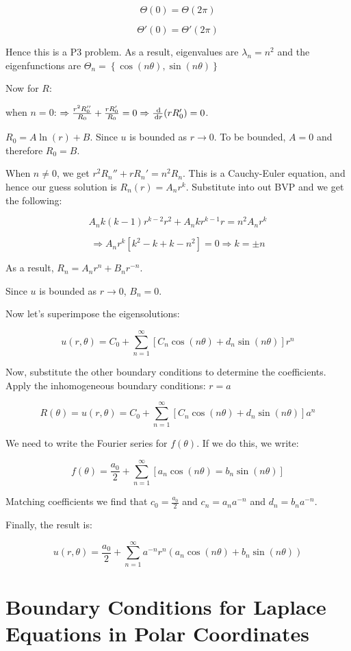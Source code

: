 \documentclass{article}
\begin{document}
$$\Theta(0) = \Theta(2 \pi)$$

$$\Theta'(0) = \Theta' (2 \pi)$$

Hence this is a P3 problem. As a result, eigenvalues are $\lambda_n = n^2$ and the eigenfunctions are $\Theta_n = \left\{ \cos (n \theta), \sin (n \theta) \right\} $


\hfill

Now for $R$:

when $n = 0$: $\Rightarrow \frac{r^2 R_0 ''}{R_0} + \frac{r R_0 '}{R_0} = 0 \Rightarrow \frac{\,\mathrm{d}}{\,\mathrm{d} r} (r R_0') = 0$. 

$R_0 = A \ln(r) + B$. Since $u$ is bounded as $r \to 0$. To be bounded, $A = 0$ and therefore $R_0 = B$. 

When $n \neq 0$, we get $r^2 R_n'' + r R_n' = n^2 R_n$. This is a Cauchy-Euler equation, and hence our guess solution is $R_n(r) = A_n r^k$. Substitute into out BVP and we get the following:

$$A_n k (k-1) r^{k-2} r^2 + A_n k r^{k-1} r = n^2 A_n r^k$$

$$\Rightarrow A_n r^k \left[ k^2 - k + k - n^2 \right] = 0 \Rightarrow k = \pm n$$

As a result, $R_n = A_n r^n + B_n r^{-n}$. 

Since $u$ is bounded as $r \to 0$, $B_n = 0$. 

Now let's superimpose the eigensolutions:

$$u(r, \theta) = C_0 + \sum_{n=1}^\infty \left[ C_n \cos (n \theta) + d_n \sin (n \theta) \right] r^n$$

Now, substitute the other boundary conditions to determine the coefficients. Apply the inhomogeneous boundary conditions: $r = a$

$$R(\theta) = u(r, \theta)= C_0 + \sum_{n=1}^\infty \left[ C_n \cos (n \theta) + d_n \sin(n \theta) \right] a^n$$

We need to write the Fourier series for $f(\theta)$. If we do this, we write:

$$f(\theta) = \frac{a_0}{2} + \sum_{n=1}^\infty \left[ a_n \cos (n \theta) = b_n \sin (n \theta) \right]$$

Matching coefficients we find that $c_0 = \frac{a_0}{2}$ and $c_n = a_n a^{-n}$ and $d_n = b_n a^{-n}$. 

Finally, the result is:

$$u(r, \theta) = \frac{a_0}{2} + \sum_{n=1}^\infty a^{-n} r^n \left( a_n \cos(n \theta) + b_n \sin(n \theta) \right) $$

\section{Boundary Conditions for Laplace Equations in Polar Coordinates}
\end{document}
